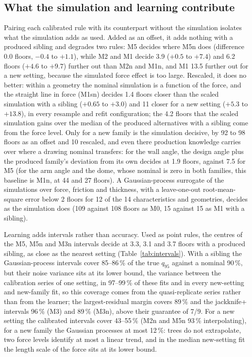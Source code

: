 \documentclass[pdflatex,sn-basic,lineno]{sn-jnl}
\begin{document}
\subsection{What the simulation and learning contribute}\label{sec:res-ml}

Pairing each calibrated rule with its counterpart without the simulation isolates what the simulation adds as used. Added as an offset, it adds nothing with a produced sibling and degrades two rules: M5 decides where M5n does (difference 0.0 floors, $-0.4$ to $+1.1$), while M2 and M1 decide 3.9 ($+0.5$ to $+7.4$) and 6.2 floors ($+4.6$ to $+9.7$) further out than M2n and M1n, and M1 13.5 further out for a new setting, because the simulated force effect is too large. Rescaled, it does no better: within a geometry the nominal simulation is a function of the force, and the straight line in force (M1sn) decides 1.4 floors closer than the scaled simulation with a sibling ($+0.65$ to $+3.0$) and 11 closer for a new setting ($+5.3$ to $+13.8$), in every resample and refit configuration; the 4.2 floors that the scaled simulation gains over the median of the produced alternatives with a sibling come from the force level. Only for a new family is the simulation decisive, by 92 to 98 floors as an offset and 10 rescaled, and even there production knowledge carries over where a drawing nominal transfers: for the wall angle, the design angle plus the produced family's deviation from its own decides at 1.9 floors, against 7.5 for M5 (for the arm angle and the dome, whose nominal is zero in both families, this baseline is M1n, at 44 and 27 floors). A Gaussian-process surrogate of the simulations over force, friction and thickness, with a leave-one-out root-mean-square error below 2 floors for 12 of the 14 characteristics and geometries, decides as the simulation does (109 against 108 floors as M0, 15 against 15 as M1 with a sibling).

Learning adds intervals rather than accuracy. Used as point rules, the centres of the M5, M5n and M3n intervals decide at 3.3, 3.1 and 3.7 floors with a produced sibling, as close as the nearest setting (Table~\ref{tab:intervals}). With a sibling the Gaussian-process intervals cover 85--86\,\% of the true $q_{95}$ against a nominal 90\,\%, but their noise variance sits at its lower bound, the variance between the calibration series of one setting, in 97--99\,\% of these fits and in every new-setting and new-family fit, so this coverage comes from the quasi-replicate series rather than from the learner; the largest-residual margin covers 89\,\% and the jackknife+ intervals 96\,\% (M3) and 89\,\% (M3n), above their guarantee of 7/9. For a new setting the calibrated intervals cover 43--55\,\% (M2n and M5n 93\,\% interpolating), for a new family the Gaussian processes at most 12\,\%: trees do not extrapolate, two force levels identify at most a linear trend, and in the median new-setting fit the length scale of the force sits at its lower bound.
\end{document}

